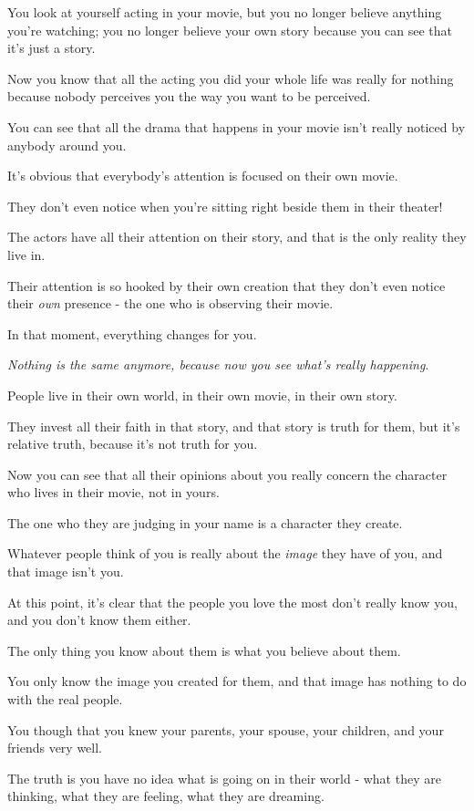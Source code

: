 \documentclass{article}
\numberwithin{equation}{section}
\begin{document}
You look at yourself acting in your movie, but you no longer believe anything you're watching; you no longer believe your own story because you can see that it's just a story.

Now you know that all the acting you did your whole life was really for nothing because nobody perceives you the way you want to be perceived.

You can see that all the drama that happens in your movie isn't really noticed by anybody around you.

It's obvious that everybody's attention is focused on their own movie.

They don't even notice when you're sitting right beside them in their theater!

The actors have all their attention on their story, and that is the only reality they live in.

Their attention is so hooked by their own creation that they don't even notice their \textit{own} presence - the one who is observing their movie.

%
In that moment, everything changes for you.

\textit{Nothing is the same anymore, because now you see what's really happening}.

People live in their own world, in their own movie, in their own story.

They invest all their faith in that story, and that story is truth for them, but it's relative truth, because it's not truth for you.

Now you can see that all their opinions about you really concern the character who lives in their movie, not in yours.

The one who they are judging in your name is a character they create.

Whatever people think of you is really about the \textit{image} they have of you, and that image isn't you.

%
At this point, it's clear that the people you love the most don't really know you, and you don't know them either.

The only thing you know about them is what you believe about them.

You only know the image you created for them, and that image has nothing to do with the real people.

You though that you knew your parents, your spouse, your children, and your friends very well.

The truth is you have no idea what is going on in their world - what they are thinking, what they are feeling, what they are dreaming.
\end{document}
